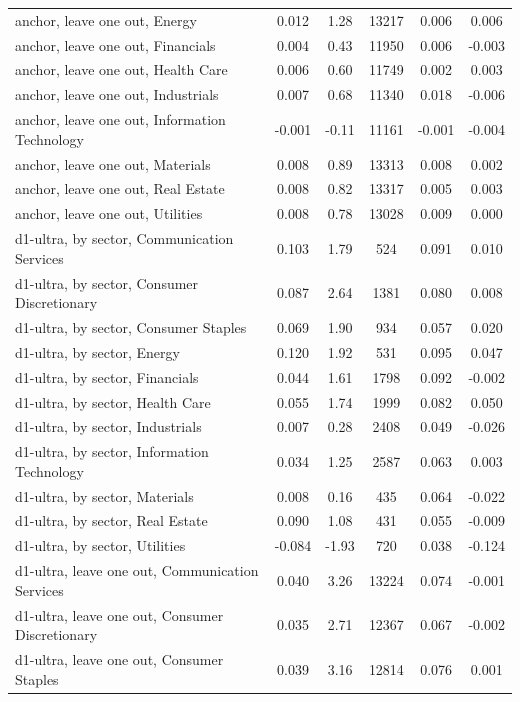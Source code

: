 \begin{longtable}{@{}lS[table-format=-1.3]S[table-format=-1.2]S[table-format=5.0]S[table-format=-1.3]S[table-format=-1.3]@{}}
anchor, leave one out, Energy & 0.012 & 1.28 & 13217 & 0.006 & 0.006 \\
anchor, leave one out, Financials & 0.004 & 0.43 & 11950 & 0.006 & -0.003 \\
anchor, leave one out, Health Care & 0.006 & 0.60 & 11749 & 0.002 & 0.003 \\
anchor, leave one out, Industrials & 0.007 & 0.68 & 11340 & 0.018 & -0.006 \\
anchor, leave one out, Information Technology & -0.001 & -0.11 & 11161 & -0.001 & -0.004 \\
anchor, leave one out, Materials & 0.008 & 0.89 & 13313 & 0.008 & 0.002 \\
anchor, leave one out, Real Estate & 0.008 & 0.82 & 13317 & 0.005 & 0.003 \\
anchor, leave one out, Utilities & 0.008 & 0.78 & 13028 & 0.009 & 0.000 \\
d1-ultra, by sector, Communication Services & 0.103 & 1.79 & 524 & 0.091 & 0.010 \\
d1-ultra, by sector, Consumer Discretionary & 0.087 & 2.64 & 1381 & 0.080 & 0.008 \\
d1-ultra, by sector, Consumer Staples & 0.069 & 1.90 & 934 & 0.057 & 0.020 \\
d1-ultra, by sector, Energy & 0.120 & 1.92 & 531 & 0.095 & 0.047 \\
d1-ultra, by sector, Financials & 0.044 & 1.61 & 1798 & 0.092 & -0.002 \\
d1-ultra, by sector, Health Care & 0.055 & 1.74 & 1999 & 0.082 & 0.050 \\
d1-ultra, by sector, Industrials & 0.007 & 0.28 & 2408 & 0.049 & -0.026 \\
d1-ultra, by sector, Information Technology & 0.034 & 1.25 & 2587 & 0.063 & 0.003 \\
d1-ultra, by sector, Materials & 0.008 & 0.16 & 435 & 0.064 & -0.022 \\
d1-ultra, by sector, Real Estate & 0.090 & 1.08 & 431 & 0.055 & -0.009 \\
d1-ultra, by sector, Utilities & -0.084 & -1.93 & 720 & 0.038 & -0.124 \\
d1-ultra, leave one out, Communication Services & 0.040 & 3.26 & 13224 & 0.074 & -0.001 \\
d1-ultra, leave one out, Consumer Discretionary & 0.035 & 2.71 & 12367 & 0.067 & -0.002 \\
d1-ultra, leave one out, Consumer Staples & 0.039 & 3.16 & 12814 & 0.076 & 0.001 \\

\end{longtable}
